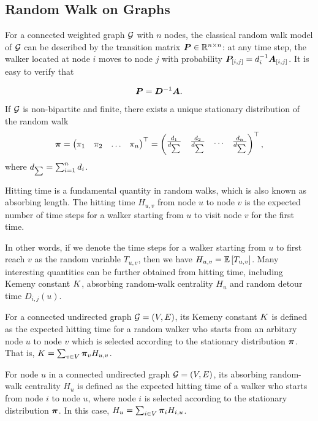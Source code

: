 \documentclass[sigconf]{acmart}
\begin{document}
\subsection{Random Walk on Graphs}\label{subsec:random-walk}

For a connected weighted graph \(\mathcal{G}\) with \(n\) nodes, the classical random walk model of \(\mathcal{G}\) can be described by the transition matrix \(\boldsymbol{P}\in\mathbb{R}^{n\times n}\): at any time step, the walker located at node \(i\) moves to node \(j\) with probability \({\boldsymbol{P}_{[i,j]}=d_i^{-1}\boldsymbol{A}_{[i,j]}}\).
It is easy to verify that

\begin{equation}\label{eq:trs}
  \boldsymbol{P}=\boldsymbol{D}^{-1}\boldsymbol{A}.
\end{equation}

If \(\mathcal{G}\) is non-bipartite and finite, there exists a unique stationary distribution of the random walk~\cite{Cv80}
\[
  \boldsymbol{\pi}=\begin{pmatrix}
    \pi_1 & \pi_2 & \dots & \pi_n
  \end{pmatrix}^\top=\begin{pmatrix}
    \frac{d_1}{d_{\sum}} & \frac{d_2}{d_{\sum}} & \dots & \frac{d_n}{d_{\sum}}
  \end{pmatrix}^\top,
\]
where \(d_{\sum}=\sum_{i=1}^nd_i\).

Hitting time is a fundamental quantity in random walks, which is also known as absorbing length.
The hitting time \(H_{u,v}\) from node \(u\) to node \(v\) is the expected number of time steps for a walker starting from \(u\) to visit node \(v\) for the first time.

In other words, if we denote the time steps for a walker starting from \(u\) to first reach \(v\) as the random variable \(T_{u,v}\), then we have \(H_{u,v}=\mathbb{E}\left[T_{u,v}\right]\).
Many interesting quantities can be further obtained from hitting time, including Kemeny constant \(K\), absorbing random-walk centrality \(H_u\) and random detour time \(D_{i,j}(u)\).

For a connected undirected graph \(\mathcal{G}=(V,E)\), its Kemeny constant \(K\) is defined as the expected hitting time for a random walker who starts from an arbitary node \(u\) to node \(v\) which is selected according to the stationary distribution \(\boldsymbol{\pi}\).
That is, \(K=\sum_{v\in V}\boldsymbol{\pi}_vH_{u,v}\).

For node \(u\) in a connected undirected graph \(\mathcal{G}=(V,E)\), its absorbing random-walk centrality \(H_u\) is defined as the expected hitting time of a walker who starts from node \(i\) to node \(u\), where node \(i\) is selected according to the stationary distribution \(\boldsymbol{\pi}\).
In this case, \(H_u=\sum_{i\in V}\boldsymbol{\pi}_iH_{i,u}\).
\end{document}
